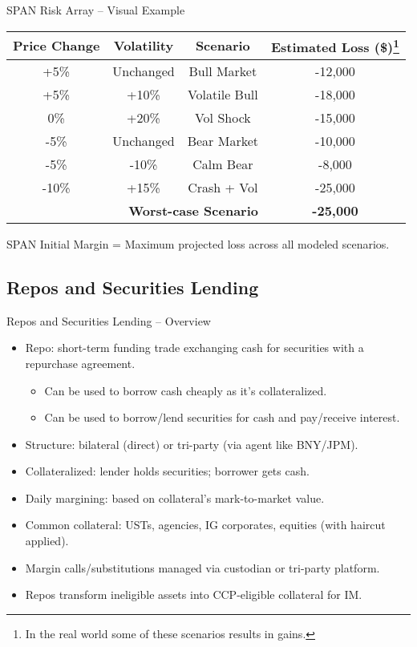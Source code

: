 \documentclass[handout, aspectratio=169]{beamer}
\begin{document}
\begin{frame}{SPAN Risk Array – Visual Example}
  \centering
  \begin{tabular}{|c|c|c|c|}
  \hline
  \textbf{Price Change} & \textbf{Volatility} & \textbf{Scenario} & \textbf{Estimated Loss (\$)\footnote{In the real world some of these scenarios results in gains.}} \\
  \hline
  +5\% & Unchanged & Bull Market & -12,000 \\
  +5\% & +10\%     & Volatile Bull & -18,000 \\
  0\%  & +20\%     & Vol Shock     & -15,000 \\
  -5\% & Unchanged & Bear Market   & -10,000 \\
  -5\% & -10\%     & Calm Bear     & -8,000 \\
  -10\% & +15\%    & Crash + Vol   & -25,000 \\
  \hline
  \multicolumn{3}{|r|}{\textbf{Worst-case Scenario}} & \textbf{-25,000} \\
  \hline
  \end{tabular}
  
  {\footnotesize SPAN Initial Margin = Maximum projected loss across all modeled scenarios.}
\end{frame}
    
\subsection{Repos and Securities Lending}
\begin{frame}{Repos and Securities Lending – Overview}
  \begin{itemize}
    \item Repo: short-term funding trade exchanging cash for securities with a repurchase agreement.
    \begin{itemize}
      \item Can be used to borrow cash cheaply as it's collateralized.
      \item Can be used to borrow/lend securities for cash and pay/receive interest.
    \end{itemize}
    \item Structure: bilateral (direct) or tri-party (via agent like BNY/JPM).
    \item Collateralized: lender holds securities; borrower gets cash.
    \item Daily margining: based on collateral's mark-to-market value.
    \item Common collateral: USTs, agencies, IG corporates, equities (with haircut applied).
    \item Margin calls/substitutions managed via custodian or tri-party platform.
    \item Repos transform ineligible assets into CCP-eligible collateral for IM.
  \end{itemize}
\end{frame}
\end{document}
